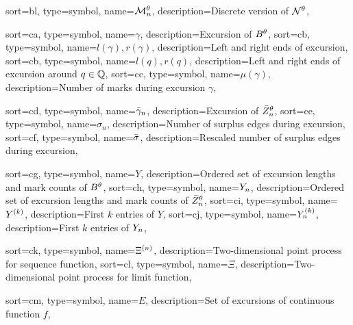 {
	sort={bl},
	type=symbol,
name={$\mathcal{M}_n^{\theta}$},
description={Discrete version of $\mathcal{N}^{\theta}$, \pageref{D: Ndis}}
}






{
	sort={ca},
	type=symbol,
	name={$\gamma$},
	description={Excursion of $B^{\theta}$, \pageref{I: gamma}}
}
{
	sort={cb},
	type=symbol,
name={$l(\gamma), r(\gamma)$},
description={Left and right ends of excursion, \pageref{I: rgammalgamma}}
}
{
sort={cb},
type=symbol,
name={$l(q), r(q)$},
description={Left and right ends of excursion around $q \in \mathbb{Q}$, \pageref{E: def l(q)}}
}
{
	sort={cc},
	type=symbol,
name={$\mu(\gamma)$},
description={Number of marks during excursion $\gamma$, \pageref{I: mugamma}}
}

{
	sort={cd},
	type=symbol,
name={$\bar{\gamma}_n$},
description={Excursion of $\bar{Z}^{\theta}_n$, \pageref{L: sum rgamman}}
}
{
	sort={ce},
	type=symbol,
name={$\sigma_n$},
description={Number of surplus edges during excursion, \pageref{T: Main}}
}
{
	sort={cf},
	type=symbol,
name={$\bar{\sigma}$},
description={Rescaled number of surplus edges during excursion, \pageref{E: def Yn}}
}

{
	sort={cg},
	type=symbol,
name={$Y$},
description={Ordered set of excursion lengths and mark counts of $B^{\theta}$, \pageref{E: def Y}}
}
{
	sort={ch},
	type=symbol,
name={$Y_n$},
description={Ordered set of excursion lengths and mark counts of $\bar{Z}^{\theta}_n$, \pageref{E: def Yn}}
}
{
	sort={ci},
	type=symbol,
name={$Y^{(k)}$},
description={First $k$ entries of $Y$, \pageref{E: def Yk Ynk}}
}
{
	sort={cj},
	type=symbol,
name={$Y_n^{(k)}$},
description={First $k$ entries of $Y_n$, \pageref{E: def Yk Ynk}}
}

{
	sort={ck},
	type=symbol,
	name={$\Xi^{(n)}$},
	description={Two-dimensional point process for sequence function, \pageref{L: Deterministic Lemma}}
}
{
	sort={cl},
	type=symbol,
name={$\Xi$},
description={Two-dimensional point process for limit function, \pageref{L: Deterministic Lemma}}
}

{
	sort={cm},
	type=symbol,
	name={$E$},
	description={Set of excursions of continuous function $f$, \pageref{L: Deterministic Lemma}}
}

